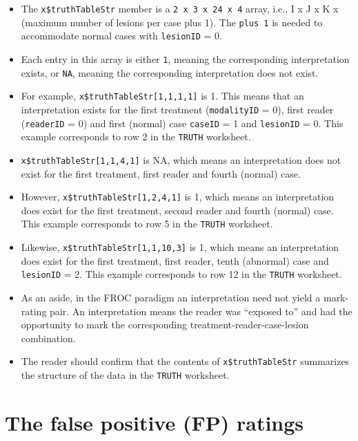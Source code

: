 \documentclass[
]{book}
\providecommand{\tightlist}{%
  \setlength{\itemsep}{0pt}\setlength{\parskip}{0pt}}
\begin{document}
\begin{itemize}
\tightlist
\item
  The \texttt{x\$truthTableStr} member is a \texttt{2\ x\ 3\ x\ 24\ x\ 4} array, i.e., I x J x K x (maximum number of lesions per case plus 1). The \texttt{plus\ 1} is needed to accommodate normal cases with \texttt{lesionID} = 0.
\item
  Each entry in this array is either \texttt{1}, meaning the corresponding interpretation exists, or \texttt{NA}, meaning the corresponding interpretation does not exist.
\item
  For example, \texttt{x\$truthTableStr{[}1,1,1,1{]}} is 1. This means that an interpretation exists for the first treatment (\texttt{modalityID} = 0), first reader (\texttt{readerID} = 0) and first (normal) case \texttt{caseID} = 1 and \texttt{lesionID} = 0. This example corresponds to row 2 in the \texttt{TRUTH} worksheet.
\item
  \texttt{x\$truthTableStr{[}1,1,4,1{]}} is NA, which means an interpretation does not exist for the first treatment, first reader and fourth (normal) case.
\item
  However, \texttt{x\$truthTableStr{[}1,2,4,1{]}} is 1, which means an interpretation does exist for the first treatment, second reader and fourth (normal) case. This example corresponds to row 5 in the \texttt{TRUTH} worksheet.
\item
  Likewise, \texttt{x\$truthTableStr{[}1,1,10,3{]}} is 1, which means an interpretation does exist for the first treatment, first reader, tenth (abnormal) case and \texttt{lesionID} = 2. This example corresponds to row 12 in the \texttt{TRUTH} worksheet.
\item
  As an aside, in the FROC paradigm an interpretation need not yield a mark-rating pair. An interpretation means the reader was ``exposed to'' and had the opportunity to mark the corresponding treatment-reader-case-lesion combination.
\item
  The reader should confirm that the contents of \texttt{x\$truthTableStr} summarizes the structure of the data in the \texttt{TRUTH} worksheet.
\end{itemize}

\hypertarget{the-false-positive-fp-ratings-3}{%
\section{The false positive (FP) ratings}\label{the-false-positive-fp-ratings-3}}
\end{document}
